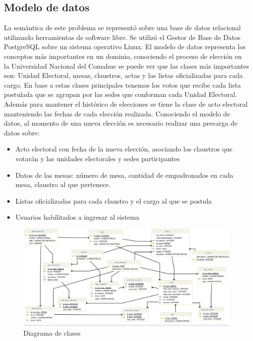 \subsection{Modelo de datos}
La semántica de este problema se representó sobre una base de datos relacional utilizando herramientas de software libre. Se utilizó el Gestor de Base de Datos PostgreSQL sobre un sistema operativo Linux. El modelo de datos representa los conceptos más importantes en un dominio, conociendo el proceso de elección en la Universidad Nacional del Comahue se puede ver que las clases más importantes son: Unidad Electoral, mesas, claustros, actas y las listas oficializadas para cada cargo. En base a estas clases principales tenemos los votos que recibe cada lista postulada que se agrupan por las sedes que conforman cada Unidad Electoral. Además para mantener el histórico de elecciones se tiene la clase de acto electoral manteniendo las fechas de cada elección realizada.\newline
Conociendo el modelo de datos, al momento de una nueva elección es necesario realizar una precarga de datos sobre:
\begin{itemize}
    \item Acto electoral con fecha de la nueva elección, asociando los claustros que votarán y las unidades electorales y sedes participantes
    \item Datos de las mesas: número de mesa, cantidad de empadronados en cada mesa, claustro al que pertenece.
    \item Listas oficializadas para cada claustro y el cargo al que se postula
    \item Usuarios habilitados a ingresar al sistema
\end{itemize}

\begin{figure}[h!]
  \includegraphics[width=\textwidth]{gu_kena_diagramaBD.jpg}
  \caption{Diagrama de clases}
  \label{graf:diagramaBD}
\end{figure}

